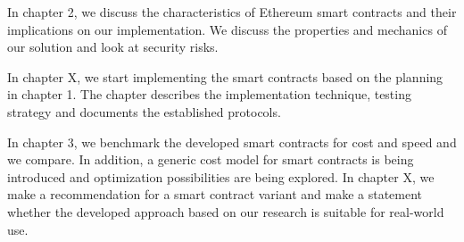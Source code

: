 In chapter 2, we discuss the characteristics of Ethereum smart contracts and their implications on our implementation. We discuss the properties and mechanics of our solution and look at security risks.

In chapter X, we start implementing the smart contracts based on the planning in chapter 1. The chapter describes the implementation technique, testing strategy and documents the established protocols.

In chapter 3, we benchmark the developed smart contracts for cost and speed and we compare. In addition, a generic cost model for smart contracts is being introduced and optimization possibilities are being explored.
In chapter X, we make a recommendation for a smart contract variant and make a statement whether the developed approach based on our research is suitable for real-world use.
